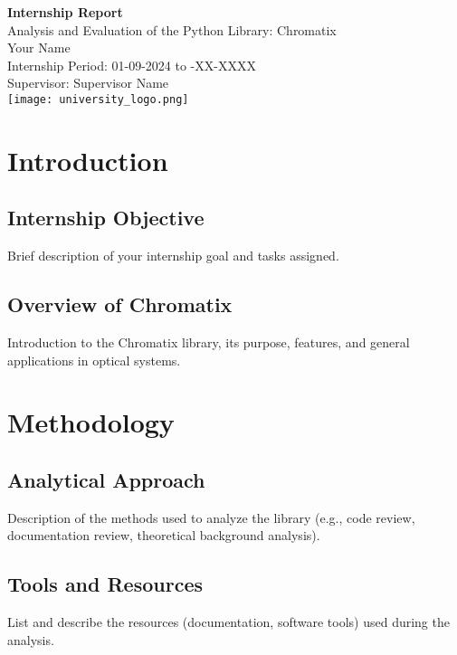 \documentclass[a4paper,12pt]{report}
\begin{document}
\begin{titlepage}
    \centering
    \vspace*{2cm}
    {\Huge\bfseries Internship Report\\[0.3cm]}
    \vspace{1cm}
    {\LARGE Analysis and Evaluation of the Python Library: Chromatix}\\[1.5cm]
    {\large Your Name}\\[0.2cm]
    {\large Internship Period: 01-09-2024 to -XX-XXXX}\\[0.2cm]
    {\large Supervisor: Supervisor Name}\\[2cm]
    \texttt{[image: university\_logo.png]}\\[2cm]
    \vfill
\end{titlepage}

\tableofcontents
\newpage

\chapter{Introduction}
\section{Internship Objective}
Brief description of your internship goal and tasks assigned.

\section{Overview of Chromatix}
Introduction to the Chromatix library, its purpose, features, and general applications in optical systems.

\chapter{Methodology}
\section{Analytical Approach}
Description of the methods used to analyze the library (e.g., code review, documentation review, theoretical background analysis).

\section{Tools and Resources}
List and describe the resources (documentation, software tools) used during the analysis.
\end{document}
